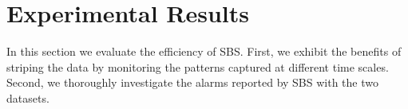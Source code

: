 
\section{Experimental Results}
In this section we evaluate the efficiency of SBS.
First, we exhibit the benefits of striping the data by monitoring the patterns captured at different time scales.
Second, we thoroughly investigate the alarms reported by SBS with the two datasets.


\begin{figure}[t!]
\hfill
{}\\
\hfill

\end{figure}
